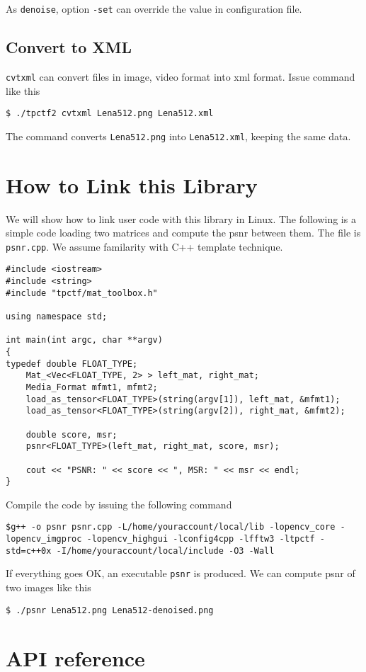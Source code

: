 \documentclass[a4paper,5pt]{article}
\begin{document}
As \lstinline{denoise}, option \lstinline{-set} can  override the value in configuration file.

\subsection{Convert to XML}

\lstinline{cvtxml} can convert files in image, video format into xml format. Issue command like this

\lstinline{$ ./tpctf2 cvtxml Lena512.png Lena512.xml}

The command converts \lstinline{Lena512.png} into \lstinline{Lena512.xml}, keeping the same data.

\section{How to Link this Library}
We will show how to link user code with this library in Linux. The following is a simple code loading two matrices and compute the psnr between them. The file is \lstinline{psnr.cpp}. We assume familarity with C++ template technique.

\begin{lstlisting}
#include <iostream>
#include <string>
#include "tpctf/mat_toolbox.h"

using namespace std;

int main(int argc, char **argv)
{
typedef double FLOAT_TYPE;
	Mat_<Vec<FLOAT_TYPE, 2> > left_mat, right_mat;
	Media_Format mfmt1, mfmt2;
	load_as_tensor<FLOAT_TYPE>(string(argv[1]), left_mat, &mfmt1);
	load_as_tensor<FLOAT_TYPE>(string(argv[2]), right_mat, &mfmt2);

	double score, msr;
	psnr<FLOAT_TYPE>(left_mat, right_mat, score, msr);

	cout << "PSNR: " << score << ", MSR: " << msr << endl;
}
\end{lstlisting}

Compile the code by issuing the following command

\lstinline{$g++ -o psnr psnr.cpp -L/home/youraccount/local/lib -lopencv_core -lopencv_imgproc -lopencv_highgui -lconfig4cpp -lfftw3 -ltpctf -std=c++0x -I/home/youraccount/local/include -O3 -Wall}

If everything goes OK, an executable \lstinline{psnr} is produced. We can compute psnr of two images like this

\lstinline{$ ./psnr Lena512.png Lena512-denoised.png}

\section{API reference}
\end{document}

